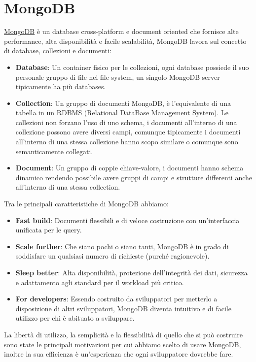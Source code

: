 \documentclass[a4paper,12pt]{report}
\newcommand{\mongodb}{\href{https://www.mongodb.com/it-it}{MongoDB} }
\begin{document}
\section{MongoDB}\label{sub:mongo}
\mongodb è un database cross-platform e document oriented che fornisce alte performance, alta disponibilità e facile scalabilità, MongoDB lavora sul concetto di database, collezioni e documenti:
\begin{itemize}
    \item \textbf{Database}: Un container fisico per le collezioni, ogni database possiede il suo personale gruppo di file nel file system, un singolo MongoDB server tipicamente ha più databases.
    \item \textbf{Collection}: Un gruppo di documenti MongoDB, è l'equivalente di una tabella in un RDBMS (Relational DataBase Management System). Le collezioni non forzano l'uso di uno schema, i documenti all'interno di una collezione possono avere diversi campi, comunque tipicamente i documenti all'interno di una stessa collezione hanno scopo similare o comunque sono semanticamente collegati.
    \item \textbf{Document}: Un gruppo di coppie chiave-valore, i documenti hanno schema dinamico rendendo possibile avere gruppi di campi e strutture differenti anche all'interno di una stessa collection.
\end{itemize}
Tra le principali caratteristiche di MongoDB abbiamo:
\begin{itemize}
    \item \textbf{Fast build}: Documenti flessibili e di veloce costruzione con un'interfaccia unificata per le query.
    \item \textbf{Scale further}: Che siano pochi o siano tanti, MongoDB è in grado di soddisfare un qualsiasi numero di richieste (purché ragionevole).
    \item \textbf{Sleep better}: Alta disponibilità, protezione dell'integrità dei dati, sicurezza e adattamento agli standard per il workload più critico.
    \item \textbf{For developers}: Essendo costruito da sviluppatori per metterlo a disposizione di altri sviluppatori, MongoDB diventa intuitivo e di facile utilizzo per chi è abituato a sviluppare.
\end{itemize}
La libertà di utilizzo, la semplicità e la flessibilità di quello che si può costruire sono state le principali motivazioni per cui abbiamo scelto di usare MongoDB, inoltre la sua efficienza è un'esperienza che ogni sviluppatore dovrebbe fare.
\end{document}
